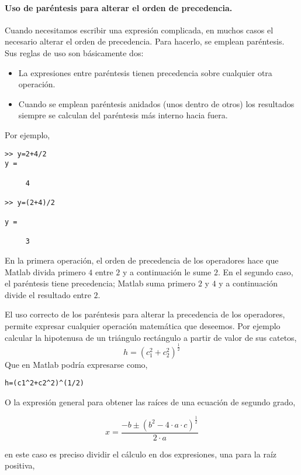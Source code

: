 \paragraph{Uso de paréntesis para alterar el orden de precedencia.}
Cuando necesitamos escribir una expresión complicada, en muchos casos el necesario alterar el orden de precedencia. Para hacerlo, se emplean paréntesis. Sus reglas de uso son básicamente dos:
\begin{itemize}
\item La expresiones entre paréntesis tienen precedencia sobre cualquier otra operación.
\item Cuando se emplean paréntesis anidados (unos dentro de otros) los resultados siempre se calculan del paréntesis más interno hacia fuera.
\end{itemize}

Por ejemplo,
\begin{verbatim}
>> y=2+4/2
y =

     4

>> y=(2+4)/2

y =

     3
\end{verbatim}

En la primera operación, el orden de precedencia de los operadores hace que Matlab divida primero $4$ entre $2$ y a continuación le sume $2$. En el segundo caso, el paréntesis tiene precedencia; Matlab suma primero $2$ y $4$ y a continuación divide el resultado entre $2$.

El uso correcto de los paréntesis para alterar la precedencia de los operadores, permite expresar cualquier operación matemática que deseemos. Por ejemplo calcular la hipotenusa de un triángulo rectángulo a partir de valor de sus catetos,
\begin{equation*}
h=(c_1^2+c_2^2)^{\frac{1}{2}}
\end{equation*}
Que en Matlab podría expresarse como,
\begin{verbatim}
h=(c1^2+c2^2)^(1/2)
\end{verbatim}

O la expresión general para obtener las raíces de una ecuación de segundo grado,

\begin{equation*}
x= \frac{-b\pm(b^2-4\cdot a \cdot c)^{\frac{1}{2}}}{2\cdot a}
\end{equation*}

en este caso es preciso dividir el cálculo en dos expresiones, una para la raíz positiva,

